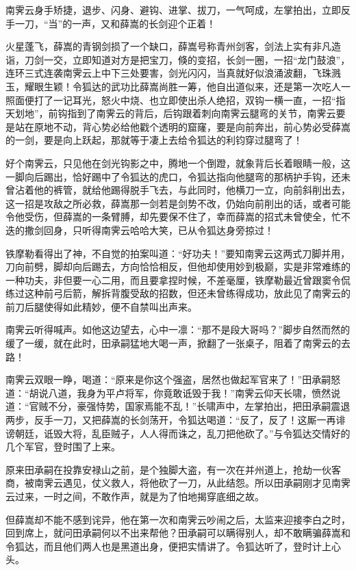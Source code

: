 \documentclass[12pt,oneside]{book}
\begin{document}
南霁云身手矫捷，退步、闪身、避钩、进掌、拔刀，一气呵成，左掌拍出，立即反手一刀，``当''的一声，又和薛嵩的长剑迎个正着！

火星蓬飞，薛嵩的青钢剑损了一个缺口，薛嵩号称青州剑客，剑法上实有非凡造诣，刀剑一交，立即知道对方是把宝刀，倏的变招，长剑一圈，一招``龙门鼓浪''，连环三式连袭南霁云上中下三处要害，剑光闪闪，当真就好似浪涌波翻，飞珠溅玉，耀眼生颖！令狐达的武功比薛嵩尚胜一筹，他自出道似来，还是第一次吃人一照面便打了一记耳光，怒火中烧、也立即使出杀人绝招，双钩一横一直，一招``指天划地''，前钩指到了南霁云的背后，后钩跟着刺向南霁云腿弯的关节，南霁云要是站在原地不动，背心势必给他戳个透明的窟窿，要是向前奔出，前心势必受薛嵩的一剑，要是向上跃起，那就等于凄上去给令狐达的利钧穿过腿弯了！

好个南霁云，只见他在剑光钩影之中，腾地一个倒蹬，就象背后长着眼睛一般，这一脚向后踢出，恰好踢中了令狐达的虎口，令狐达指向他腿弯的那柄护手钩，还未曾沾着他的裤管，就给他踢得脱手飞去，与此同时，他横刀一立，向前斜削出去，这一招是攻敌之所必救，薛嵩那一剑若是剑势不改，仍始向前削出的话，或者可能令他受伤，但薛嵩的一条臂膊，却先要保不住了，幸而薛嵩的招式未曾使全，忙不迭的撒剑回身，只听得南霁云哈哈大笑，已从令狐达身旁掠过！

铁摩勒看得出了神，不自觉的拍案叫道：``好功夫！''要知南霁云这两式刀脚并用，刀向前劈，脚却向后踢去，方向恰恰相反，但他却使用妙到极巅，实是非常难练的一种功夫，非但要一心二用，而且要拿捏时候，不差毫厘，铁摩勒最近曾跟窦令侃练过这种前弓后箭，解拆背腹受敌的招数，但还未曾练得成功，放此见了南霁云的前刀后腿使得如此精妙，便不自禁叫出声来。

南霁云听得喊声。如他这边望去，心中一凛：``那不是段大哥吗？''脚步自然而然的缓了一缓，就在此时，田承嗣猛地大喝一声，掀翻了一张桌子，阻着了南霁云的去路！

南霁云双眼一睁，喝道：``原来是你这个强盗，居然也做起军官来了！''田承嗣怒道：``胡说八道，我身为平卢将军，你竟敢诋毁于我！''南霁云仰天长啸，愤然说道：``官贼不分，豪强恃势，国家焉能不乱！''长啸声中，左掌拍出，把田承嗣震退两步，反手一刀，又把薛嵩的长剑荡开，令狐达喝道：``反了，反了！这厮一再诽谤朝廷，诋毁大将，乱臣贼子，人人得而诛之，乱刀把他砍了。''与令狐达交情好的几个军官，登时围了上来。

原来田承嗣在投靠安禄山之前，是个独脚大盗，有一次在并州道上，抢劫一伙客商，被南霁云遇见，仗义救人，将他砍了一刀，从此结怨。所以田承嗣刚才见南霁云过来，一时之间，不敢作声，就是为了怕地揭穿底细之故。

但薛嵩却不能不感到诧异，他在第一次和南霁云吵闹之后，太监来迎接李白之时，回到席上，就问田承嗣何以不出来帮他？田承嗣可以瞒得别人，却不敢瞒骗薛嵩和令狐达，而且他们两人也是黑道出身，便把实情讲了。令狐达听了，登时计上心头。
\end{document}
